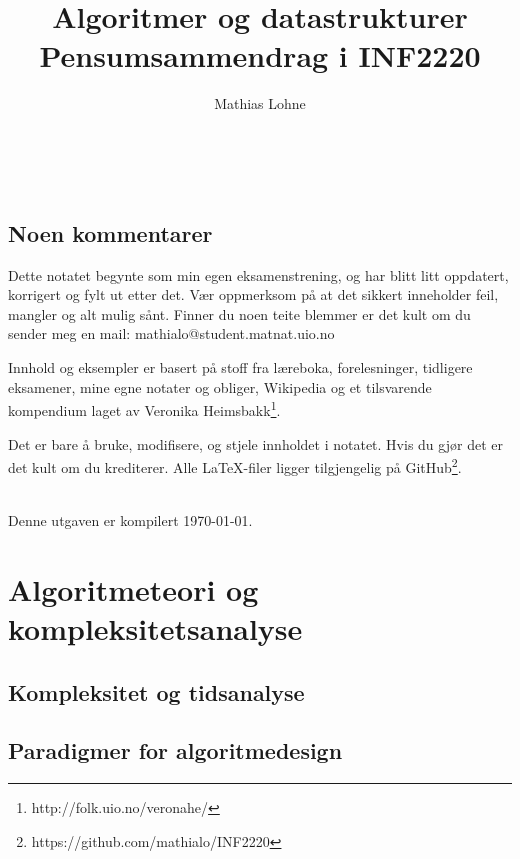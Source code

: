 \documentclass[book, 10pt, hidelinks, norsk, a4paper]{memoir}
\title{{\Huge\titlefontthin Algoritmer og datastrukturer}\\{\Large\titlefontthin Pensumsammendrag i INF2220}}
\author{\titlefontreg Mathias Lohne}
\date{}
\newcommand{\mono}[1]{{\monofont \small #1}}
\begin{document}
\frontmatter
\maketitle
\thispagestyle{empty}
\newpage
~\thispagestyle{empty}
\newpage

\begin{KeepFromToc}
	\chapter*{Noen kommentarer}
	Dette notatet begynte som min egen eksamenstrening, og har blitt litt oppdatert, korrigert og fylt ut etter det. Vær oppmerksom på at det sikkert inneholder feil, mangler og alt mulig sånt. Finner du noen teite blemmer er det kult om du sender meg en mail: \mono{mathialo@student.matnat.uio.no}
	
	Innhold og eksempler er basert på stoff fra læreboka, forelesninger, tidligere eksamener, mine egne notater og obliger, Wikipedia og et tilsvarende kompendium laget av Veronika Heimsbakk\footnote{http://folk.uio.no/veronahe/}.
	
	Det er bare å bruke, modifisere, og stjele innholdet i notatet. Hvis du gjør det er det kult om du krediterer. Alle \LaTeX-filer ligger tilgjengelig på GitHub\footnote{https://github.com/mathialo/INF2220}.
	
	~\\Denne utgaven er kompilert \today.
	\newpage
	
	\tableofcontents
\end{KeepFromToc}

\mainmatter

\part{Algoritmeteori og kompleksitetsanalyse}


\chapter{Kompleksitet og tidsanalyse}





\chapter{Paradigmer for algoritmedesign}
\vspace{-10pt}




\end{document}
